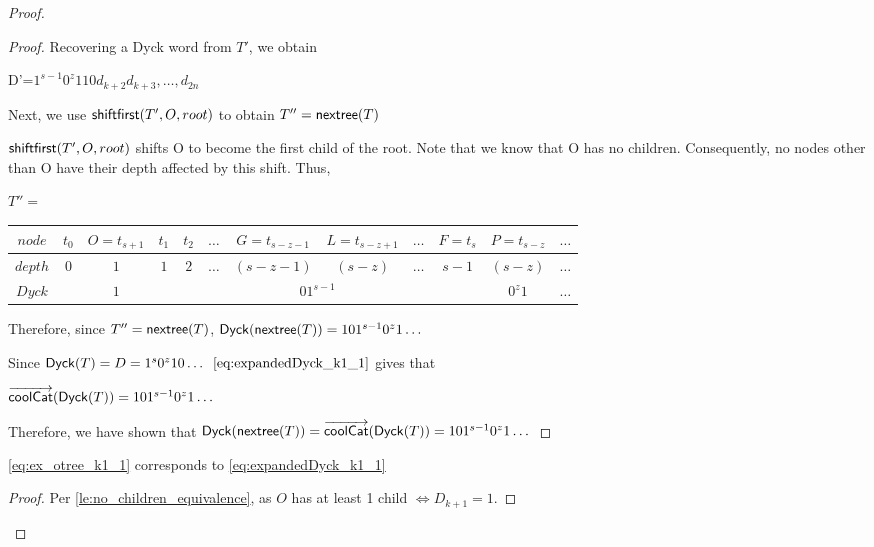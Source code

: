 \begin{proof}
\begin{proof}
    Recovering a Dyck word from $T'$, we obtain 

    D'=$1^{s-1}0^z110d_{k+2}d_{k+3},\dots,d_{2n}$


    Next, we use $\mathsf{shiftfirst(} T', O, root \mathsf{)}$ to obtain $T'' = \mathsf{nextree}{(T)}$

    $\mathsf{shiftfirst(} T', O, root \mathsf{)}$ shifts O to become the first child of the root. Note that we know that O has no children. Consequently, no nodes other than O have their depth affected by this shift. Thus, 

    \bigskip
    \bigskip


    $T''=$
    \begin{center}
	\begin{tabular}{ |c|c|c|c|c|c|c|c|c|c|c|c| } 
	    \hline

	    $node$ & $t_0$ & $O=t_{s+1}$ & $t_1$ & $t_2$ & $\dots$ & $G=t_{s-z-1}$ & $L=t_{s-z+1}$ & $\dots$ & $F=t_s$ & $P=t_{s-z}$ & $\dots$ \\
	    \hline
	    $depth$ & $0$ & $1$ & $1$ & $2$ &$\dots$ & $(s-z-1)$ & $(s-z)$ & $\dots$ & $s-1$ & $(s-z)$   & $\dots$\\
	    \hline
	    $Dyck$ &  & $1$ &  \multicolumn{7}{|c|}{$01^{s-1}$} &  $0^{z}1$   & $\dots$\\
	    \hline
	\end{tabular}
    \end{center}


    \bigskip
    \bigskip




    Therefore, since $T''=\mathsf{nextree}{(T)}$, $\mathsf{Dyck}{(\mathsf{nextree}{(T)})}=101^{s-1}0^z1\dots$

    Since $\mathsf{Dyck}{(T)}=D=1^s0^{z}10\dots$
    $\ref{eq:expandedDyck_k1_1}$ gives that

    $\overrightarrow{\mathsf{coolCat}}{(\mathsf{Dyck}{(T)})}=101^{s-1}0^z1\dots$

    Therefore, we have shown that $\mathsf{Dyck}{(\mathsf{nextree}{(T)})}=\overrightarrow{\mathsf{coolCat}}{(\mathsf{Dyck}{(T)})}=101^{s-1}0^z1\dots$

\end{proof}
\begin{lemma}
    \ref{eq:ex_otree_k1_1} corresponds to \ref{eq:expandedDyck_k1_1}
\end{lemma}
\begin{proof}

    Per \ref{le:no_children_equivalence}, as $O$ has at least 1 child $\iff D_{k+1}=1$.


\end{proof}
\end{proof}
